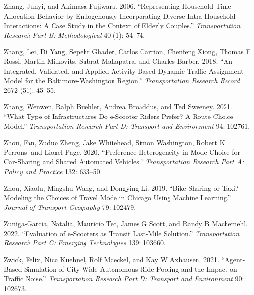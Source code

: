 \documentclass[12pt, oneside, openright]{byuthesis}
\newlength{\cslhangindent}
\newlength{\cslentryspacingunit} %
\newenvironment{CSLReferences}[2] %
 {%
  \setlength{\parindent}{0pt}
  \ifodd #1
  \let\oldpar\par
  \def\par{\hangindent=\cslhangindent\oldpar}
  \fi
  \setlength{\parskip}{#2\cslentryspacingunit}
 }%
 {}
\begin{document}
\begin{CSLReferences}{1}{0}
\leavevmode{}%
Zhang, Junyi, and Akimasa Fujiwara. 2006. {``Representing Household Time Allocation Behavior by Endogenously Incorporating Diverse Intra-Household Interactions: A Case Study in the Context of Elderly Couples.''} \emph{Transportation Research Part B: Methodological} 40 (1): 54--74.

\leavevmode{}%
Zhang, Lei, Di Yang, Sepehr Ghader, Carlos Carrion, Chenfeng Xiong, Thomas F Rossi, Martin Milkovits, Subrat Mahapatra, and Charles Barber. 2018. {``An Integrated, Validated, and Applied Activity-Based Dynamic Traffic Assignment Model for the Baltimore-Washington Region.''} \emph{Transportation Research Record} 2672 (51): 45--55.

\leavevmode{}%
Zhang, Wenwen, Ralph Buehler, Andrea Broaddus, and Ted Sweeney. 2021. {``What Type of Infrastructures Do e-Scooter Riders Prefer? A Route Choice Model.''} \emph{Transportation Research Part D: Transport and Environment} 94: 102761.

\leavevmode{}%
Zhou, Fan, Zuduo Zheng, Jake Whitehead, Simon Washington, Robert K Perrons, and Lionel Page. 2020. {``Preference Heterogeneity in Mode Choice for Car-Sharing and Shared Automated Vehicles.''} \emph{Transportation Research Part A: Policy and Practice} 132: 633--50.

\leavevmode{}%
Zhou, Xiaolu, Mingshu Wang, and Dongying Li. 2019. {``Bike-Sharing or Taxi? Modeling the Choices of Travel Mode in Chicago Using Machine Learning.''} \emph{Journal of Transport Geography} 79: 102479.

\leavevmode{}%
Zuniga-Garcia, Natalia, Mauricio Tec, James G Scott, and Randy B Machemehl. 2022. {``Evaluation of e-Scooters as Transit Last-Mile Solution.''} \emph{Transportation Research Part C: Emerging Technologies} 139: 103660.

\leavevmode{}%
Zwick, Felix, Nico Kuehnel, Rolf Moeckel, and Kay W Axhausen. 2021. {``Agent-Based Simulation of City-Wide Autonomous Ride-Pooling and the Impact on Traffic Noise.''} \emph{Transportation Research Part D: Transport and Environment} 90: 102673.

\end{CSLReferences}


\end{document}
